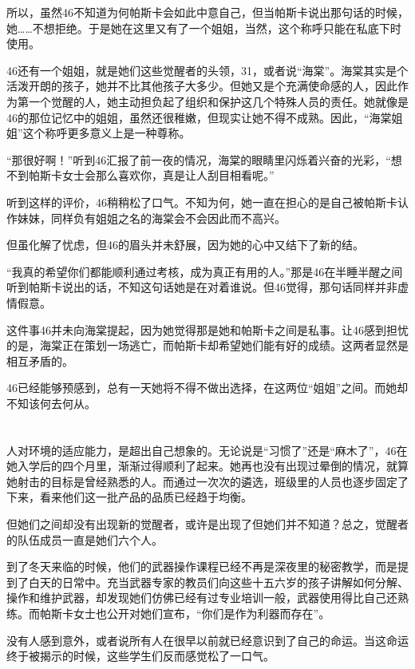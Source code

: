 所以，虽然46不知道为何帕斯卡会如此中意自己，但当帕斯卡说出那句话的时候，她……不想拒绝。于是她在这里又有了一个姐姐，当然，这个称呼只能在私底下时使用。

46还有一个姐姐，就是她们这些觉醒者的头领，31，或者说“海棠”。海棠其实是个活泼开朗的孩子，她并不比其他孩子大多少。但她又是个充满使命感的人，因此作为第一个觉醒的人，她主动担负起了组织和保护这几个特殊人员的责任。她就像是46的那位记忆中的姐姐，虽然还很稚嫩，但现实让她不得不成熟。因此，“海棠姐姐”这个称呼更多意义上是一种尊称。

“那很好啊！”听到46汇报了前一夜的情况，海棠的眼睛里闪烁着兴奋的光彩，“想不到帕斯卡女士会那么喜欢你，真是让人刮目相看呢。”

听到这样的评价，46稍稍松了口气。不知为何，她一直在担心的是自己被帕斯卡认作妹妹，同样负有姐姐之名的海棠会不会因此而不高兴。

但虽化解了忧虑，但46的眉头并未舒展，因为她的心中又结下了新的结。

“我真的希望你们都能顺利通过考核，成为真正有用的人。”那是46在半睡半醒之间听到帕斯卡说出的话，不知这句话她是在对着谁说。但46觉得，那句话同样并非虚情假意。

这件事46并未向海棠提起，因为她觉得那是她和帕斯卡之间是私事。让46感到担忧的是，海棠正在策划一场逃亡，而帕斯卡却希望她们能有好的成绩。这两者显然是相互矛盾的。

46已经能够预感到，总有一天她将不得不做出选择，在这两位“姐姐”之间。而她却不知该何去何从。

\section*{}

人对环境的适应能力，是超出自己想象的。无论说是“习惯了”还是“麻木了”，46在她入学后的四个月里，渐渐过得顺利了起来。她再也没有出现过晕倒的情况，就算她射击的目标是曾经熟悉的人。而通过一次次的遴选，班级里的人员也逐步固定了下来，看来他们这一批产品的品质已经趋于均衡。

但她们之间却没有出现新的觉醒者，或许是出现了但她们并不知道？总之，觉醒者的队伍成员一直是她们六个人。

到了冬天来临的时候，他们的武器操作课程已经不再是深夜里的秘密教学，而是提到了白天的日常中。充当武器专家的教员们向这些十五六岁的孩子讲解如何分解、操作和维护武器，却发现她们仿佛已经有过专业培训一般，武器使用得比自己还熟练。而帕斯卡女士也公开对她们宣布，“你们是作为利器而存在”。

没有人感到意外，或者说所有人在很早以前就已经意识到了自己的命运。当这命运终于被揭示的时候，这些学生们反而感觉松了一口气。

